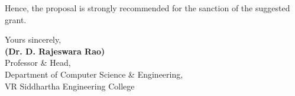 \documentclass[12pt,a4paper]{article}
\begin{document}
\noindent Hence, the proposal is strongly recommended for the sanction of the suggested grant.

\vspace{2.5em}

\begin{flushleft}
    Yours sincerely, \\
    \vspace{3.5em}
    \textbf{(Dr. D. Rajeswara Rao)} \\
    Professor \& Head, \\
    Department of Computer Science \& Engineering, \\
    VR Siddhartha Engineering College
\end{flushleft}
\end{document}
